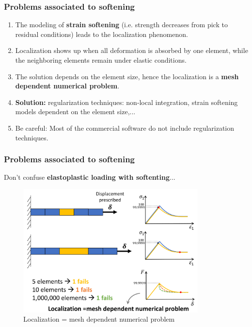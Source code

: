 \documentclass[notes]{beamer}
\begin{document}
\begin{frame}
\frametitle{Problems associated to softening}
\begin{enumerate}
	\item The modeling of \textbf{strain softening} (i.e. strength decreases from pick to residual conditions) leads to the localization
	phenomenon.
	\item Localization shows up when all deformation is absorbed by one element, while the neighboring elements remain under elastic conditions.
	\item The solution depends on the element size, hence the localization is a \textbf{mesh dependent numerical problem}.
	\item \textbf{Solution: }regularization techniques:  non‐local integration, strain softening models dependent on the element size,...
	\item Be careful: Most of the commercial software do not include regularization techniques.
\end{enumerate}
\end{frame}


\begin{frame}
\frametitle{Problems associated to softening}
Don't confuse \textbf{elastoplastic loading with softenting}...
\begin{figure}
	\includegraphics[width=0.85\textwidth]{figs/localization.png}
	\caption*{Localization = mesh dependent numerical problem}
\end{figure}
\end{frame}
\end{document}
